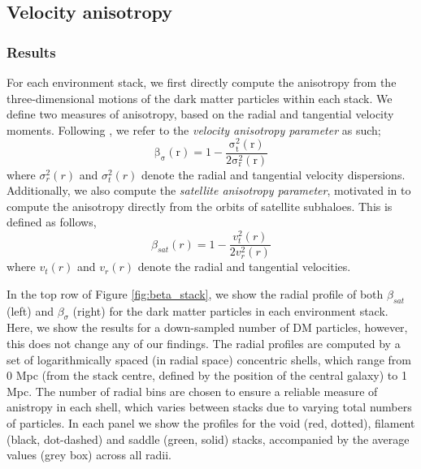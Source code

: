 \subsection{Velocity anisotropy} \label{sec:velocity_anisotropy}
\subsubsection{Results}
For each environment stack, we first directly compute the anisotropy from the three-dimensional motions of the dark matter particles within each stack. We define two measures of anisotropy, based on the radial and tangential velocity moments. Following \citet{faltenbacher2010}, we refer to the \textit{velocity anisotropy parameter} as such;
\begin{equation} \label{eq:vel_ani_sigma}
\mathrm{\beta_{\sigma}(r) = 1 - \frac{\sigma_t^2(r)}{2 \sigma_r^2(r)} }
\end{equation}
where $\sigma_r^2(r)$ and $\sigma_t^2(r)$ denote the radial and tangential velocity dispersions. Additionally, we also compute the \textit{satellite anisotropy parameter}, motivated in \citet{garaldi2018} to compute the anisotropy directly from the orbits of satellite subhaloes. This is defined as follows,
\begin{equation}
\beta_{sat}(r) = 1 - \frac{v_{t}^2(r)}{2 v_{r}^{2}(r)} 
\end{equation}
where $v_{t}(r)$ and $v_{r}(r)$ denote the radial and tangential velocities.

In the top row of Figure \ref{fig:beta_stack}, we show the radial profile of both $\beta_{sat}$ (left) and $\beta_{\sigma}$ (right) for the dark matter particles in each environment stack. Here, we show the results for a down-sampled number of DM particles, however, this does not change any of our findings. The radial profiles are computed by a set of logarithmically spaced (in radial space) concentric shells, which range from 0 Mpc (from the stack centre, defined by the position of the central galaxy) to 1 Mpc. The number of radial bins are chosen to ensure a reliable measure of anistropy in each shell, which varies between stacks due to varying total numbers of particles. In each panel we show the profiles for the void (red, dotted), filament (black, dot-dashed) and saddle (green, solid) stacks, accompanied by the average values (grey box) across all radii. 

